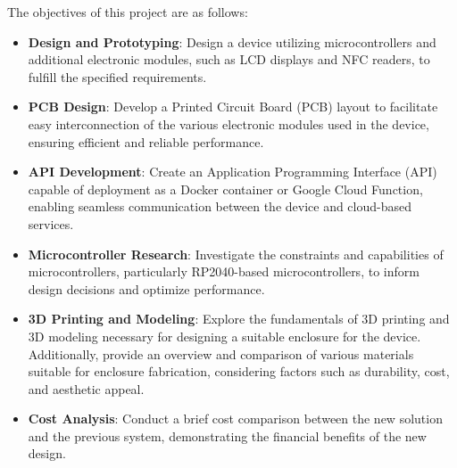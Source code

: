 The objectives of this project are as follows:
\begin{itemize}
    \item \textbf{Design and Prototyping}: Design a device utilizing microcontrollers and additional electronic 
    modules, such as LCD displays and NFC readers, to fulfill the specified requirements.
    \item \textbf{PCB Design}: Develop a Printed Circuit Board (PCB) layout to facilitate easy interconnection of 
    the various electronic modules used in the device, ensuring efficient and reliable performance.
    \item \textbf{API Development}: Create an Application Programming Interface (API) capable of deployment as a 
    Docker container or Google Cloud Function, enabling seamless communication between the device and cloud-based services.
    \item \textbf{Microcontroller Research}: Investigate the constraints and capabilities of microcontrollers, particularly 
    RP2040-based microcontrollers, to inform design decisions and optimize performance.
    \item \textbf{3D Printing and Modeling}: Explore the fundamentals of 3D printing and 3D modeling necessary for 
    designing a suitable enclosure for the device. Additionally, provide an overview and comparison of various materials 
    suitable for enclosure fabrication, considering factors such as durability, cost, and aesthetic appeal.
    \item \textbf{Cost Analysis}: Conduct a brief cost comparison between the new solution and the previous system, 
    demonstrating the financial benefits of the new design.
\end{itemize}
